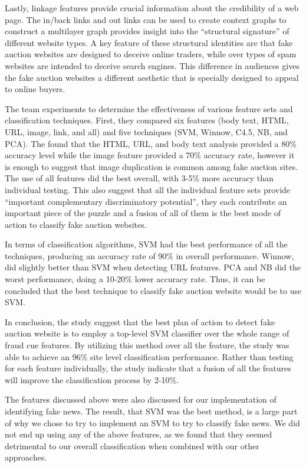 \documentclass{eptcs}
\begin{document}
Lastly, linkage features provide crucial information about the credibility of a web page. The in/back links and out links can be used to create context graphs to construct a multilayer graph provides insight into the “structural signature” of different website types. A key feature of these structural identities are that fake auction websites are designed to deceive online traders, while over types of spam websites are intended to deceive search engines. This difference in audiences gives the fake auction websites a different aesthetic that is specially designed to appeal to online buyers. 

The team experiments to determine the effectiveness of various feature sets and classification techniques. First, they compared six features (body text, HTML, URL, image, link, and all) and five techniques (SVM, Winnow, C4.5, NB, and PCA). The found that the HTML, URL, and body text analysis provided a 80\% accuracy level while the image feature provided a 70\% accuracy rate, however it is enough to suggest that image duplication is common among fake auction sites. The use of all features did the best overall, with 3-5\% more accuracy than individual testing. This also suggest that all the individual feature sets provide “important complementary discriminatory potential”, they each contribute an important piece of the puzzle and a fusion of all of them is the best mode of action to classify fake auction websites.

In terms of classification algorithms, SVM had the best performance of all the techniques, producing an accuracy rate of 90\% in overall performance. Winnow, did slightly better than SVM when detecting URL features. PCA and NB did the worst performance, doing a 10-20\% lower accuracy rate. Thus, it can be concluded that the best technique to classify fake auction website would be to use SVM. 

In conclusion, the study suggest that the best plan of action to detect fake auction website is to employ a top-level SVM classifier over the whole range of fraud cue features. By utilizing this method over all the feature, the study was able to achieve an 96\% site level classification performance. Rather than testing for each feature individually, the study indicate that a fusion of all the features will improve the classification process by 2-10\%. 

The features discussed above were also discussed for our implementation of identifying fake news. The result, that SVM was the best method, is a large part of why we chose to try to implement an SVM to try to classify fake news. We did not end up using any of the above features, as we found that they seemed detrimental to our overall classification when combined with our other approaches.
\end{document}
